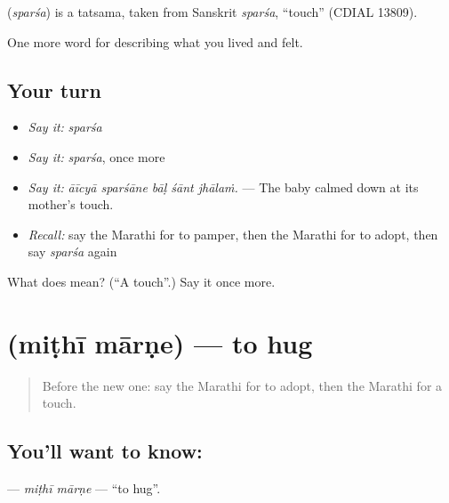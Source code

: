 \begin{cousinweb}
\textbf{} (\emph{sparśa}) is a tatsama, taken from Sanskrit \emph{sparśa}, \textquotedblleft{}touch\textquotedblright{} (CDIAL 13809).
\end{cousinweb}

\begin{grammarlens}[title={What you've built}]
One more word for describing what you lived and felt.
\end{grammarlens}

\subsection*{Your turn}
\begin{itemize}
\raggedright
  \item \emph{Say it:} \emph{sparśa}
  \item \emph{Say it:} \emph{sparśa}, once more
  \item \emph{Say it:} \emph{āīcyā sparśāne bāḷ śānt jhālaṁ.} — The baby calmed down at its mother's touch.
  \item \emph{Recall:} say the Marathi for to pamper, then the Marathi for to adopt, then say \emph{sparśa} again
\end{itemize}

\begin{tcolorbox}[breakable,colback=teal!4,colframe=teal!35!black,title={Before you move on}]
What does  mean? (\textquotedblleft{}A touch\textquotedblright{}.) Say it once more.
\end{tcolorbox}
\section[\texorpdfstring{\mr{मिठी} \mr{मारणे} (miṭhī mārṇe)}{मिठी मारणे (miṭhī mārṇe)}]{  (miṭhī mārṇe) — to hug}

\label{lesson:MR-C501-mithi-marne}



\begin{quote}
Before the new one: say the Marathi for to adopt, then the Marathi for a touch.
\end{quote}

\subsection*{You'll want to know:  }
\textbf{ } — \emph{miṭhī mārṇe} — \textquotedblleft{}to hug\textquotedblright{}.

